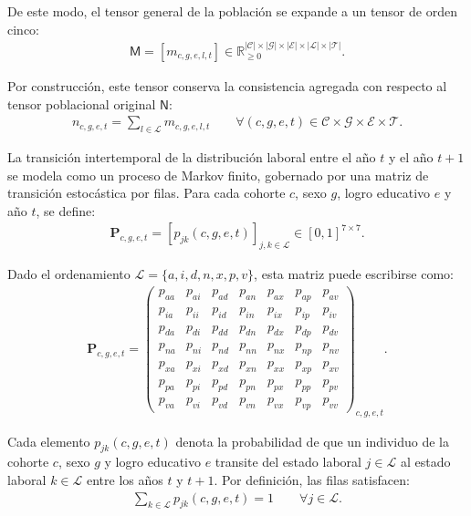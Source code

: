 \documentclass[11pt]{article}
\begin{document}
De este modo, el tensor general de la población se expande a un tensor de orden cinco:
\begin{align*}
\mathsf{M}
=
[m_{c,g,e,l,t}]
\in
\mathbb{R}_{\geq 0}^{|\mathcal{C}| \times |\mathcal{G}| \times |\mathcal{E}| \times |\mathcal{L}| \times |\mathcal{T}|}.
\end{align*}

Por construcción, este tensor conserva la consistencia agregada con respecto al tensor poblacional original \(\mathsf{N}\):
\begin{align*}
n_{c,g,e,t}
=
\sum_{l \in \mathcal{L}} m_{c,g,e,l,t}
\qquad
\forall (c,g,e,t)
\in
\mathcal{C}\times\mathcal{G}\times\mathcal{E}\times\mathcal{T}.
\end{align*}

La transición intertemporal de la distribución laboral entre el año \(t\) y el año \(t+1\) se modela como un proceso de Markov finito, gobernado por una matriz de transición estocástica por filas. Para cada cohorte \(c\), sexo \(g\), logro educativo \(e\) y año \(t\), se define:
\begin{align*}
\mathbf{P}_{c,g,e,t}
=
\left[p_{jk}(c,g,e,t)\right]_{j,k\in\mathcal{L}}
\in
[0,1]^{7\times 7}.
\end{align*}

Dado el ordenamiento \(\mathcal{L}=\{a,i,d,n,x,p,v\}\), esta matriz puede escribirse como:
\begin{align*}
\mathbf{P}_{c,g,e,t}
=
\begin{pmatrix}
p_{aa} & p_{ai} & p_{ad} & p_{an} & p_{ax} & p_{ap} & p_{av} \\
p_{ia} & p_{ii} & p_{id} & p_{in} & p_{ix} & p_{ip} & p_{iv} \\
p_{da} & p_{di} & p_{dd} & p_{dn} & p_{dx} & p_{dp} & p_{dv} \\
p_{na} & p_{ni} & p_{nd} & p_{nn} & p_{nx} & p_{np} & p_{nv} \\
p_{xa} & p_{xi} & p_{xd} & p_{xn} & p_{xx} & p_{xp} & p_{xv} \\
p_{pa} & p_{pi} & p_{pd} & p_{pn} & p_{px} & p_{pp} & p_{pv} \\
p_{va} & p_{vi} & p_{vd} & p_{vn} & p_{vx} & p_{vp} & p_{vv}
\end{pmatrix}_{c,g,e,t}.
\end{align*}

Cada elemento \(p_{jk}(c,g,e,t)\) denota la probabilidad de que un individuo de la cohorte \(c\), sexo \(g\) y logro educativo \(e\) transite del estado laboral \(j\in\mathcal{L}\) al estado laboral \(k\in\mathcal{L}\) entre los años \(t\) y \(t+1\). Por definición, las filas satisfacen:
\begin{align*}
\sum_{k \in \mathcal{L}} p_{jk}(c,g,e,t)=1
\qquad
\forall j\in\mathcal{L}.
\end{align*}
\end{document}
